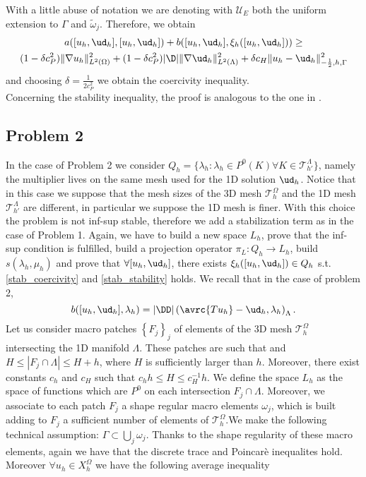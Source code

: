 With a little abuse of notation we are denoting with $\mathcal{U}_E$ both the uniform extension to $\Gamma$ and $\tilde{\omega}_j$. Therefore, we obtain
\begin{multline*}
a([u_h, {\ud}_h],[u_h, {\ud}_h] ) + b([u_h, {\ud}_h], \xi_h([u_h, {\ud}_h]))
\geq \\
(1-\delta c_P^2) \|\nabla u_h\|^2_{L^2(\Omega)} + (1- \delta c_P^2) |\D|\|\nabla {\ud}_h\|^2_{L^2(\Lambda)}
+\delta c_H \|u_h-{\ud}_h\|^2_{-\frac 12,h,\Gamma}
\end{multline*}
and choosing $\delta=\frac{1}{2c_P^2}$ we obtain the coercivity inequality.\\
Concerning the stability inequality, the proof is analogous to the one in \cite{burman2014}.

\subsection{Problem 2} In the case of Problem 2 we consider $Q_h=\{\lambda_{h} : \lambda_h \in P^0(K) \forall K \in \mathcal{T}^{\Lambda}_{h'}\}$, namely the multiplier lives on the same mesh used for the 1D solution ${\ud}_h$. Notice that in this case we suppose that the mesh sizes of the 3D mesh $	\mathcal{T}^{\Omega}_h$ and the 1D mesh $\mathcal{T}^{\Lambda}_{h'}$ are different, in particular we suppose the 1D mesh is finer. With this choice the problem is not inf-sup stable, therefore we add a stabilization term as in the case of Problem 1. Again, we have to build a new space $L_h$, prove that the inf-sup condition is fulfilled, build a projection operator $\pi_L: Q_h \rightarrow L_h$, build $s(\lambda_h, \mu_h)$ and prove that $\forall [u_h, {\ud}_h]$, there exists $\xi_h([u_h, {\ud}_h]) \in Q_h$ s.t. \eqref{stab_coercivity} and \eqref{stab_stability} holds. We recall that in the case of problem 2, 
\begin{equation*}
b([u_h, {\ud}_h], \lambda _h) = |\DD|\left(\avrc{T u_h} - {\ud}_h, \lambda _h\right)_{\Lambda}.
\end{equation*}
Let us consider macro patches $\left\{ F_j \right\}_j$ of elements of the 3D mesh $\mathcal{T}_h^{\Omega}$ intersecting the 1D manifold $\Lambda$. These patches are such that and  $H\leq |F_j\cap \Lambda|\leq H+h$, where $H$ is sufficiently larger than $h$. Moreover, there exist constants $c_h$ and $c_H$ such that $c_hh\leq H \leq c_H^{-1}h$. We define the space $L_h$ as the space of functions which are $P^0$ on each intersection $F_j\cap \Lambda$. Moreover, we associate to each patch $F_j$ a shape regular macro elements $\omega_j$, which is built adding to $F_j$ a sufficient number of elements of $\mathcal{T}_h^{\Omega}$.We make the following technical assumption: $\Gamma \subset \bigcup _{j} \omega_j$. Thanks to the shape regularity of these macro elements, again we have that the discrete trace and Poincarè inequalites hold. Moreover $\forall u_h \in X_h^\Omega$ we have the following average inequality 
